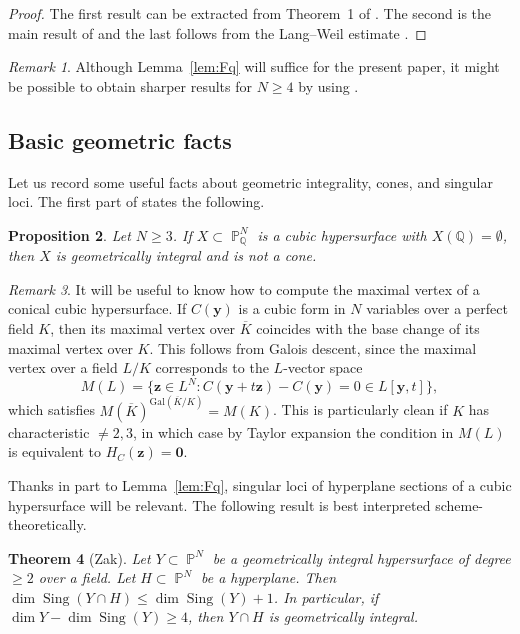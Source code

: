 \documentclass[a4paper,11pt, twoside,reqno]{amsart}
\theoremstyle{plain}
\newtheorem{thm}{Theorem}[section]
\newtheorem{prop}[thm]{Proposition}
\theoremstyle{definition}
\theoremstyle{remark}
\newtheorem{rem}[thm]{Remark}
\newcommand{\Gal}{\mathrm{Gal}}
\newcommand{\bfy}{\bm{y}}
\newcommand{\bfz}{\bm{z}}
\newcommand{\QQ}{\mathbb{Q}}
\DeclareMathOperator{\PP}{\mathbb{P}}
\DeclareMathOperator{\Sing}{Sing}
\renewcommand{\bar}{\overline}
\renewcommand{\leq}{\leqslant}
\renewcommand{\ge}{\geqslant}
\numberwithin{equation}{section}
\begin{document}
\begin{proof}
The first result can be extracted from
Theorem~1 of \cite{Hoo91}.
The second is the main result of 
\cite{Bro13} and the last follows from the  Lang--Weil estimate \cite{LW}.
\end{proof}

\begin{rem}
Although Lemma~\ref{lem:Fq} will suffice for the present paper, 
it might be possible to obtain sharper results for $N\ge 4$
by using \cite[Theorem~5.5]{Wan23}. 
\end{rem}

\subsection{Basic geometric facts}

Let us record some useful facts about geometric integrality,
cones, and singular loci.
The first part of \cite[Lemma~1]{Bro10} states the following.

\begin{prop}
\label{Bro-integral-cone}
Let $N\ge 3$.
If $X \subset \PP^N_\QQ$ is a cubic hypersurface
with $X(\QQ) = \emptyset$,
then $X$ is geometrically integral and is not a cone.
\end{prop}

\begin{rem}
\label{field-of-maximal-vertex}
It will be useful to know how to compute the
maximal vertex of a conical cubic hypersurface.
If $C(\bfy)$ is a cubic form in $N$ variables
over a perfect field $K$,
then its maximal vertex over $\bar{K}$
coincides with the base change of its maximal vertex over $K$.
This follows from Galois descent,
since the maximal vertex over a field $L/K$ corresponds to the $L$-vector space
\[
M(L) = \{\bfz\in L^N: C(\bfy+t\bfz) - C(\bfy) = 0\in L[\bfy,t]\},
\]
which satisfies $M(\bar{K})^{\Gal(\bar{K}/K)} = M(K)$.
This is particularly clean if $K$ has characteristic $\neq 2,3$,
in which case by Taylor expansion the condition in $M(L)$
is equivalent to $H_C(\bfz)=\bm{0}$.
\end{rem}


Thanks in part to Lemma~\ref{lem:Fq},
singular loci of hyperplane sections of a cubic hypersurface will be relevant.
The following result is best interpreted scheme-theoretically.

\begin{thm}[Zak]
\label{Thm: ZaksBoundSingLocus}
Let $Y\subset \PP^N$ be a geometrically integral hypersurface of degree $\ge 2$ over a field.
Let $H\subset \PP^N$ be a hyperplane.
Then $\dim \Sing(Y\cap H)\leq \dim\Sing(Y)+1$.
In particular, if $\dim Y - \dim\Sing(Y) \ge 4$,
then $Y\cap H$ is geometrically integral.
\end{thm}
\end{document}
